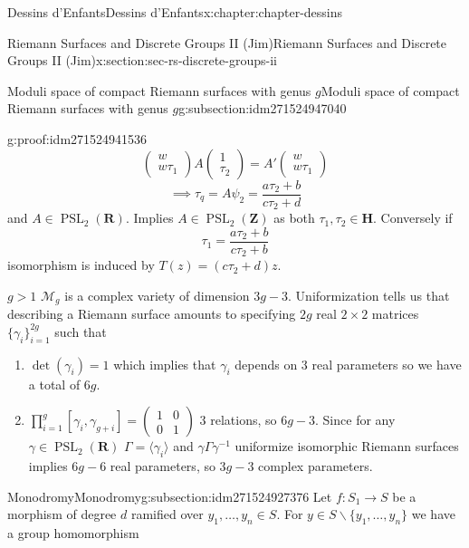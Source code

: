 \documentclass[oneside,10pt,]{book}
\numberwithin{equation}{section}
\newcommand{\inv}{^{-1}}
\newcommand{\lb}{[}
\newcommand{\rb}{]}
\newcommand{\ZZ}{\mathbf{Z}}
\newcommand{\RR}{\mathbf{R}}
\newcommand{\HH}{\mathbf{H}}
\DeclareMathOperator{\PSL}{PSL}
\newcommand{\gt}{>}
\newcommand{\amp}{&}
\begin{document}
\begin{chapterptx}{Dessins d'Enfants}{}{Dessins d'Enfants}{}{}{x:chapter:chapter-dessins}
\begin{sectionptx}{Riemann Surfaces and Discrete Groups II (Jim)}{}{Riemann Surfaces and Discrete Groups II (Jim)}{}{}{x:section:sec-rs-discrete-groups-ii}
\begin{subsectionptx}{Moduli space of compact Riemann surfaces with genus \(g\)}{}{Moduli space of compact Riemann surfaces with genus \(g\)}{}{}{g:subsection:idm271524947040}
\begin{proofptx}{}{g:proof:idm271524941536}
\begin{equation*}
\begin{pmatrix} w\\ w\tau_1 \end{pmatrix} A \begin{pmatrix}1\\ \tau_2\end{pmatrix} = A' \begin{pmatrix} w \\ w\tau_1 \end{pmatrix}
\end{equation*}
%
\begin{equation*}
\implies \tau_q = A \psi_2 = \frac{a\tau_2 + b}{c\tau_2 + d}
\end{equation*}
and \(A \in \PSL_2(\RR)\). Implies \(A\in \PSL_2(\ZZ)\) as both \(\tau_1,\tau_2 \in \HH\). Conversely if%
\begin{equation*}
\tau_1 = \frac{a\tau_2 + b}{c\tau_2 + b}
\end{equation*}
isomorphism is induced by \(T(z) = (c\tau_2 + d) z\).%
\end{proofptx}
\(g \gt 1\) \(\mathcal M_g\) is a complex variety of dimension \(3g-3\). Uniformization tells us that describing a Riemann surface amounts to specifying \(2g\) real \(2\times 2\) matrices \(\{\gamma_i\}_{i=1}^{2g}\) such that%
\begin{enumerate}
\item{}\(\det(\gamma_i) = 1\) which implies that \(\gamma_i\) depends on 3 real parameters so we have a total of \(6g\).%
\item{}\(\prod_{i=1}^g \lb \gamma_i, \gamma_{g+i}\rb = \begin{pmatrix} 1\amp 0 \\ 0\amp 1\end{pmatrix}\) 3 relations, so \(6g- 3\). Since for any \(\gamma \in \PSL_2(\RR)\) \(\Gamma = \langle \gamma_i \rangle\) and \(\gamma\Gamma \gamma\inv\) uniformize isomorphic Riemann surfaces implies \(6g-6\) real parameters, so \(3g-3\) complex parameters.%
\end{enumerate}
%
\end{subsectionptx}
%
%
\typeout{************************************************}
\typeout{************************************************}
%
\begin{subsectionptx}{Monodromy}{}{Monodromy}{}{}{g:subsection:idm271524927376}
Let \(f\colon S_1 \to S\) be a morphism of degree \(d\) ramified over \(y_1,\ldots, y_n \in S\). For \(y\in S\smallsetminus \{y_1,\ldots, y_n\}\) we have a group homomorphism%

\end{subsectionptx}
\end{sectionptx}
\end{chapterptx}
\end{document}
